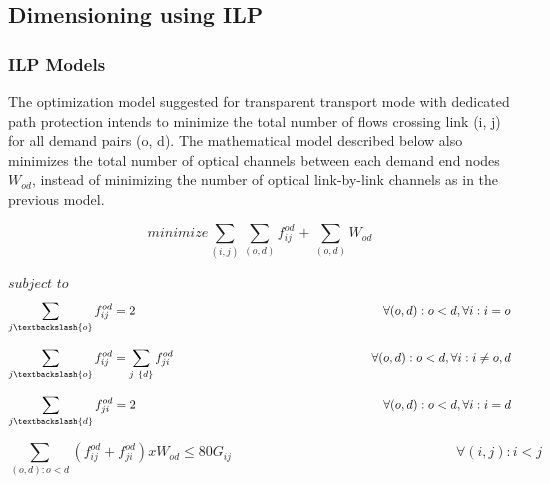 \subsection{Dimensioning using ILP}

\subsubsection{ILP Models} \label{ILP_models_Transp}
The optimization model suggested for transparent transport mode with dedicated path protection intends to minimize the total number of flows crossing link (i, j) for all demand pairs (o, d). The mathematical model described below also minimizes the total number of optical channels between each demand end nodes $W_{od}$, instead of minimizing the number of optical link-by-link channels as in the previous model.

\begin{equation}
minimize    \sum_{(i,j)} \sum_{(o,d)} f_{ij}^{od} + \sum_{(o,d)} W_{od}
\label{ILPTransp}
\end{equation}

$subject$ $to$
\begin{equation}
\sum_{j\textbackslash \{o\}} f_{ij}^{od} = 2  \qquad \qquad \qquad \qquad \qquad \qquad \qquad \qquad \qquad \qquad
\forall(o,d) : o < d, \forall i: i = o
\label{ILPTransp1}
\end{equation}

\vspace{-5pt}
\begin{equation}
\sum_{j\textbackslash \{o\}} f_{ij}^{od} = \sum_{j\ \{d\}} f_{ji}^{od}   \qquad \qquad \qquad \qquad \qquad \qquad \qquad \qquad
\forall(o,d) : o < d, \forall i: i \neq o,d
\label{ILPTransp2}
\end{equation}

\vspace{-5pt}
\begin{equation}
\sum_{j\textbackslash \{d\}} f_{ji}^{od} = 2  \qquad \qquad \qquad \qquad \qquad \qquad \qquad \qquad \qquad \qquad
\forall(o,d) : o < d, \forall i: i = d
\label{ILPTransp3}
\end{equation}

\vspace{-5pt}
\begin{equation}
\sum_{(o,d):o<d} \left(f_{ij}^{od} + f_{ji}^{od}\right) x W_{od} \leq 80 G_{ij} \qquad \qquad \qquad \qquad \qquad \qquad \qquad \qquad
\forall(i,j) : i < j
\label{ILPTransp4}
\end{equation}

